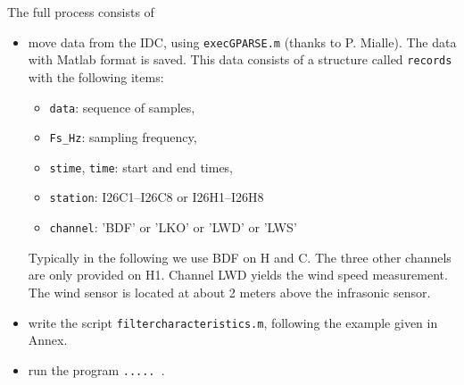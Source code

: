The full process consists of
\begin{itemize}
\item
 move data from the IDC, using {\tt execGPARSE.m} (thanks to P. Mialle). The data with Matlab format is saved. This data consists of a structure called {\tt records} with the following items:
 \begin{itemize}
 \item
{\tt data}: sequence of samples,
 \item
{\tt Fs\_Hz}: sampling frequency,
\item
{\tt stime}, {\tt time}: start and end times, 
\item
{\tt station}: I26C1--I26C8 or I26H1--I26H8
\item
{\tt channel}: 'BDF' or 'LKO' or 'LWD' or 'LWS'
 \end{itemize}   
Typically in the following we use BDF on H and C.   The three other channels are only provided on H1. Channel LWD yields  the wind speed measurement. The wind sensor is located at about 2 meters above the infrasonic sensor.
    
\item
 write the script {\tt filtercharacteristics.m}, following the example given in Annex.
 \item
 run the program {\tt ..... }.
\end{itemize}